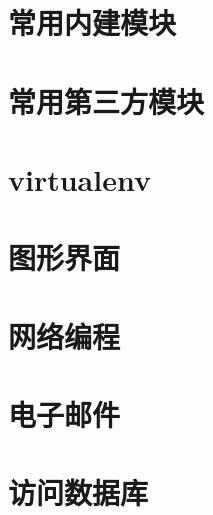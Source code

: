 \newpage
\section{常用内建模块}

\newpage

\newpage

\newpage

\newpage

\newpage

\newpage

\newpage

\newpage

\newpage

\newpage

\newpage



\newpage
\section{常用第三方模块}

\newpage

\newpage

\newpage

\newpage



\newpage
\section{virtualenv}



\newpage
\section{图形界面}

\newpage



\newpage
\section{网络编程}

\newpage

\newpage

\newpage



\newpage
\section{电子邮件}

\newpage

\newpage



\newpage
\section{访问数据库}

\newpage

\newpage

\newpage



